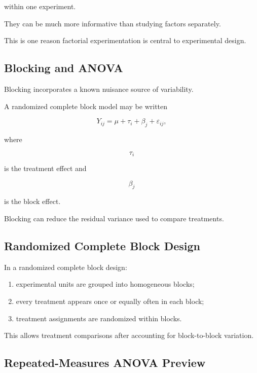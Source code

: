 within one experiment.

They can be much more informative than studying factors separately.

This is one reason factorial experimentation is central to experimental
design.

\subsection{Blocking and ANOVA}
\label{subsec:blocking-anova}

Blocking incorporates a known nuisance source of variability.

A randomized complete block model may be written

\[
\boxed{
Y_{ij}
=
\mu
+
\tau_i
+
\beta_j
+
\varepsilon_{ij},
}
\]

where

\[
\tau_i
\]

is the treatment effect and

\[
\beta_j
\]

is the block effect.

Blocking can reduce the residual variance used to compare treatments.

\subsection{Randomized Complete Block Design}
\label{subsec:randomized-complete-block-design}

In a randomized complete block design:

\begin{enumerate}
    \item experimental units are grouped into homogeneous blocks;
    \item every treatment appears once or equally often in each block;
    \item treatment assignments are randomized within blocks.
\end{enumerate}

This allows treatment comparisons after accounting for block-to-block
variation.

\subsection{Repeated-Measures ANOVA Preview}
\label{subsec:repeated-measures-anova}

